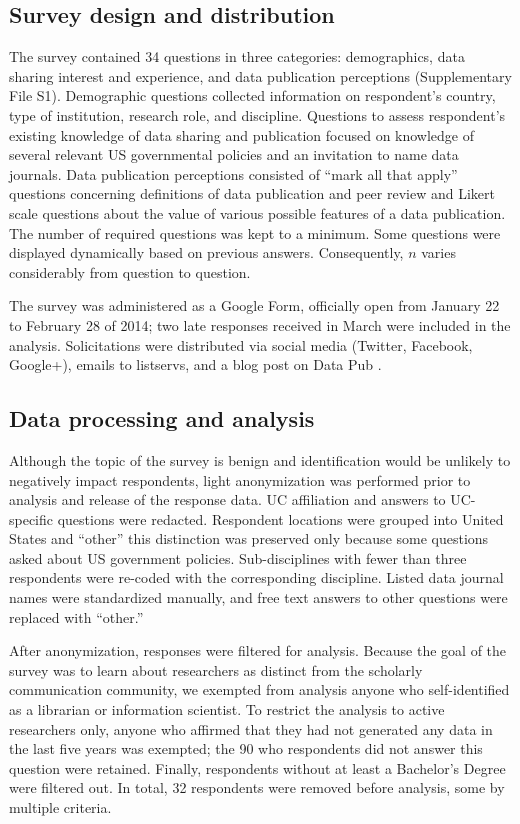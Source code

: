 \documentclass[10pt]{article}
\begin{document}
\subsection*{Survey design and distribution}

The survey contained 34 questions in three categories: demographics, data sharing interest and experience, and data publication perceptions (Supplementary File S1).
Demographic questions collected information on respondent's country, type of institution, research role, and discipline.
Questions to assess respondent's existing knowledge of data sharing and publication focused on knowledge of several relevant US governmental policies and an invitation to name data journals.
Data publication perceptions consisted of ``mark all that apply'' questions concerning definitions of data publication and peer review and Likert scale questions about the value of various possible features of a data publication.
The number of required questions was kept to a minimum.
Some questions were displayed dynamically based on previous answers. 
Consequently, $n$ varies considerably from question to question.

The survey was administered as a Google Form, officially open from January 22 to February 28 of 2014; two late responses received in March were included in the analysis.
Solicitations were distributed via social media (Twitter, Facebook, Google+), emails to listservs, and a blog post on Data Pub \cite{kratz_data_2014}.

\subsection*{Data processing and analysis}
Although the topic of the survey is benign and identification would be unlikely to negatively impact respondents, light anonymization was performed prior to analysis and release of the response data.
UC affiliation and answers to UC-specific questions were redacted.
Respondent locations were grouped into United States and ``other'' this distinction was preserved only because some questions asked about US government policies.  
Sub-disciplines with fewer than three respondents were re-coded with the corresponding discipline.
Listed data journal names were standardized manually, and free text answers to other questions were replaced with ``other.''

After anonymization, responses were filtered for analysis.
Because the goal of the survey was to learn about researchers as distinct from the scholarly communication community, we exempted from analysis anyone who self-identified as a librarian or information scientist.
To restrict the analysis to active researchers only, anyone who affirmed that they had not generated any data in the last five years was exempted; the 90 who respondents did not answer this question were retained.
Finally, respondents without at least a Bachelor's Degree were filtered out.
In total, 32 respondents were removed before analysis, some by multiple criteria.
\end{document}
